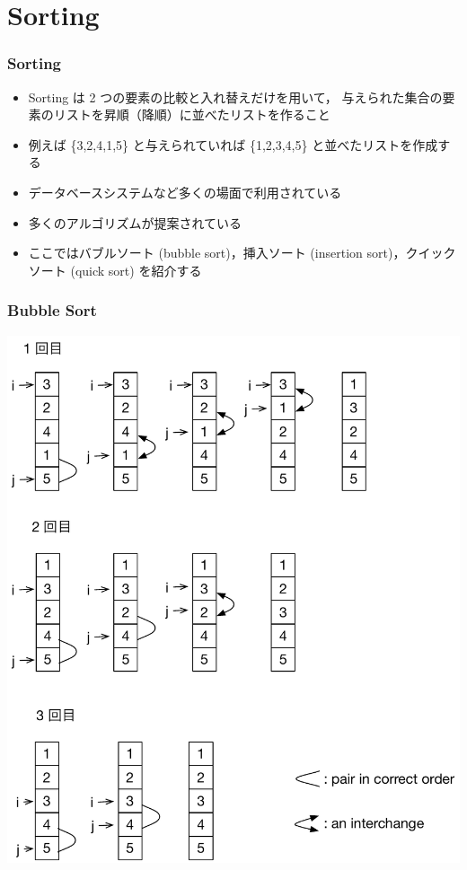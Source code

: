\section{Sorting}
\begin{frame}[shrink]
\frametitle{Sorting}
  \begin{itemize}
\item Sorting は 2 つの要素の比較と入れ替えだけを用いて，
与えられた集合の要素のリストを昇順（降順）に並べたリストを作ること
\item 例えば \{3,2,4,1,5\} と与えられていれば \{1,2,3,4,5\} と並べたリストを作成する
\item データベースシステムなど多くの場面で利用されている
\item 多くのアルゴリズムが提案されている
\item ここではバブルソート (bubble sort)，挿入ソート (insertion sort)，クイックソート (quick sort) を紹介する
  \end{itemize}
\end{frame}
\begin{frame}[shrink]
\frametitle{Bubble Sort}
  \begin{center}
\includegraphics[scale=0.4]{./Figure/bubble_sort.pdf}
  \end{center}
\end{frame}
